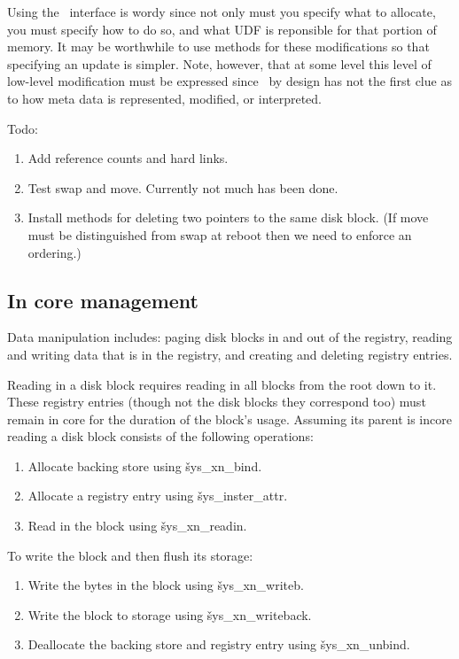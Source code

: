 Using the \xxx\ interface is wordy since not only must you specify what
to allocate, you must specify how to do so, and what UDF is reponsible
for that portion of memory.  It may be worthwhile to use methods for
these modifications so that specifying an update is simpler.  Note,
however, that at some level this level of low-level modification must
be expressed since \xxx\ by design has not the first clue as to how
meta data is represented, modified, or interpreted.

Todo:
\begin{enumerate}
	\item Add reference counts and hard links.

	\item Test swap and move.  Currently not much has
	been done.

	\item Install methods for deleting two pointers to the
	same disk block.  (If move must be distinguished from 
	swap at reboot then we need to enforce an ordering.)

\end{enumerate}

\subsection{In core management}

Data manipulation includes: paging disk blocks in and out of the
registry, reading and writing data that is in the registry,
and creating and deleting registry entries.

Reading in a disk block requires reading in all blocks from
the root down to it.  These registry entries (though not the
disk blocks they correspond too) must remain in core for the
duration of the block's usage.  Assuming its parent is incore
reading a disk block consists of the following operations:
\begin{enumerate}
	\item Allocate backing store using \v{sys\_xn\_bind}.
	\item Allocate a registry entry using \v{sys\_inster\_attr}.
	\item Read in the block using \v{sys\_xn\_readin}.
\end{enumerate}
To write the block and then flush its storage:
\begin{enumerate}
	\item Write the bytes in the block using \v{sys\_xn\_writeb}.
	\item Write the block to storage using \v{sys\_xn\_writeback}.
	\item Deallocate the backing store and registry entry 
	using \v{sys\_xn\_unbind}.
\end{enumerate}


